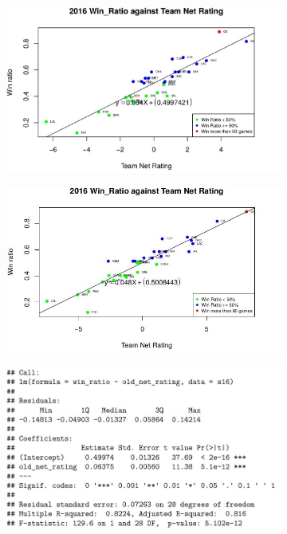 \documentclass[11pt]{article}
\begin{document}
\begin{figure}[h!]
  \centering
  \begin{subfigure}[b]{0.45\linewidth}
    \includegraphics[width=\linewidth]{nr_16.jpg}
  \end{subfigure}
  \begin{subfigure}[b]{0.45\linewidth}
    \includegraphics[width=\linewidth]{new_nr_16.jpg}
  \end{subfigure}
  \begin{subfigure}[b]{0.42\linewidth}
    \includegraphics[width=\linewidth]{nr_16_summary.jpg}

\end{subfigure}
\end{figure}
\end{document}
